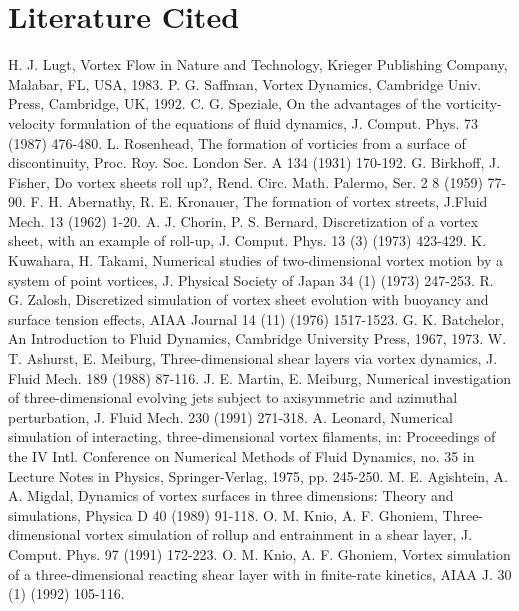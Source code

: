 \documentclass[letterpaper,12pt]{report}
\begin{document}
\chapter{Literature Cited}
\begin{thebibliography}{9}
H. J. Lugt, Vortex Flow in Nature and Technology, Krieger Publishing Company, Malabar, FL, USA, 1983.
P. G. Saffman, Vortex Dynamics, Cambridge Univ. Press, Cambridge, UK, 1992.
C. G. Speziale, On the advantages of the vorticity-velocity formulation of the equations of fluid dynamics, J. Comput. Phys. 73 (1987) 476-480.
L. Rosenhead, The formation of vorticies from a surface of discontinuity, Proc. Roy. Soc. London Ser. A 134 (1931) 170-192.
G. Birkhoff, J. Fisher, Do vortex sheets roll up?, Rend. Circ. Math. Palermo, Ser. 2 8 (1959) 77-90.
F. H. Abernathy, R. E. Kronauer, The formation of vortex streets, J.Fluid Mech. 13 (1962) 1-20.
A. J. Chorin, P. S. Bernard, Discretization of a vortex sheet, with an example of roll-up, J. Comput. Phys. 13 (3) (1973) 423-429.
K. Kuwahara, H. Takami, Numerical studies of two-dimensional vortex motion by a system of point vortices, J. Physical Society of Japan 34 (1) (1973) 247-253.
R. G. Zalosh, Discretized simulation of vortex sheet evolution with buoyancy and surface tension effects, AIAA Journal 14 (11) (1976) 1517-1523.
G. K. Batchelor, An Introduction to Fluid Dynamics, Cambridge University Press, 1967, 1973.
W. T. Ashurst, E. Meiburg, Three-dimensional shear layers via vortex dynamics, J. Fluid Mech. 189 (1988) 87-116.
J. E. Martin, E. Meiburg, Numerical investigation of three-dimensional evolving jets subject to axisymmetric and azimuthal perturbation, J. Fluid Mech. 230 (1991) 271-318.
A. Leonard, Numerical simulation of interacting, three-dimensional vortex filaments, in: Proceedings of the IV Intl. Conference on Numerical Methods of Fluid Dynamics, no. 35 in Lecture Notes in Physics, Springer-Verlag, 1975, pp. 245-250.
M. E. Agishtein, A. A. Migdal, Dynamics of vortex surfaces in three dimensions: Theory and simulations, Physica D 40 (1989) 91-118.
O. M. Knio, A. F. Ghoniem, Three-dimensional vortex simulation of rollup and entrainment in a shear layer, J. Comput. Phys. 97 (1991) 172-223.
O. M. Knio, A. F. Ghoniem, Vortex simulation of a three-dimensional reacting shear layer with in finite-rate kinetics, AIAA J. 30 (1) (1992) 105-116.

\end{thebibliography}
\end{document}
